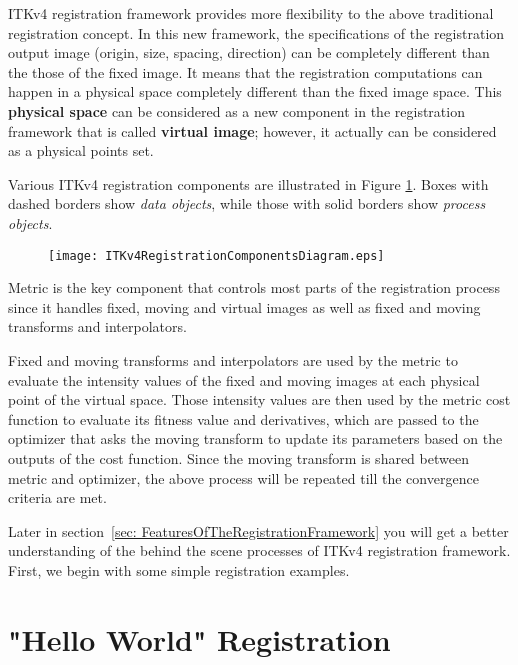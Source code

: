 ITKv4 registration framework provides more flexibility to the above traditional
registration concept. In this new framework, the specifications of the registration
output image (origin, size, spacing, direction) can be completely different than
the those of the fixed image. It means that the registration computations can happen
in a physical space completely different than the fixed image space. This
\textbf{physical space} can be considered as a new component in the registration
framework that is called \textbf{virtual image}; however, it actually can be
considered as a physical points set.

Various ITKv4 registration components are illustrated in Figure
\ref{fig:ITKv4RegistrationComponents}. Boxes with dashed borders show
\emph{data objects}, while those with solid borders show \emph{process objects}.

\begin{figure}
\center
\texttt{[image: ITKv4RegistrationComponentsDiagram.eps]}
\label{fig:ITKv4RegistrationComponents}
\end{figure}

Metric is the key component that controls most parts of the registration process
since it handles fixed, moving and virtual images as well as fixed and moving
transforms and interpolators.

Fixed and moving transforms and interpolators are used by the metric to evaluate
the intensity values of the fixed and moving images at each physical point of the
virtual space. Those intensity values are then used by the metric cost function to
evaluate its fitness value and derivatives, which are passed to the optimizer that
asks the moving transform to update its parameters based on the outputs of the cost
function. Since the moving transform is shared between metric and optimizer,
the above process will be repeated till the convergence criteria are met.

Later in section~\ref{sec: FeaturesOfTheRegistrationFramework} you will get a
better understanding of the behind the scene processes of ITKv4 registration
framework. First, we begin with some simple registration examples.


\section{"Hello World" Registration}
\label{sec:IntroductionImageRegistration}
\ifitkFullVersion

\fi

